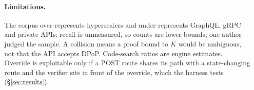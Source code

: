 \paragraph{Limitations.} The corpus over-represents hyperscalers and
under-represents GraphQL, gRPC and private APIs; recall is unmeasured, so
counts are lower bounds; one author judged the sample. A collision means a
proof bound to $K$ would be ambiguous, not that the API accepts DPoP.
Code-search ratios are engine estimates. Override is exploitable only if a
POST route shares its path with a state-changing route and the verifier sits
in front of the override, which the harness tests (\S\ref{sec:results}).
